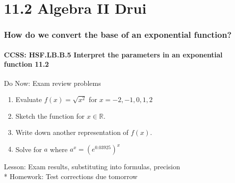 \documentclass{beamer}
\begin{document}
\section{11.2 Algebra II Drui}
\frame
{
  \frametitle{How do we convert the base of an exponential function?}
  \framesubtitle{CCSS: HSF.LB.B.5 Interpret the parameters in an exponential function \qquad \alert{11.2}}

  \begin{block}{Do Now: Exam review problems}
  \begin{enumerate}
    \item Evaluate $f(x)=\sqrt{x^2}$ for $x=-2, -1, 0, 1, 2$
    \item Sketch the function for $x \in \mathbb{R}$.
    \item Write down another representation of $f(x)$.
    \item Solve for $a$ where $a^x=(e^{0.03925})^x$
    \end{enumerate}
  \end{block}
  Lesson: Exam results, substituting into formulas, precision\\*
  Homework: Test corrections due tomorrow\\}
\end{document}
